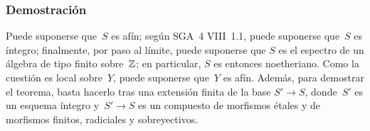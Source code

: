 \subsubsection*{Demostración}
Puede suponerse que~$S$ es afín; según SGA~4 VIII~1.1, puede suponerse
que~$S$ es íntegro; finalmente, por paso al límite, puede suponerse que
$S$ es el espectro de un álgebra de tipo finito sobre~$\mathbb Z$; en
particular, $S$ es entonces noetheriano.
Como la cuestión es local sobre~$Y$, puede suponerse que~$Y$ es afín.
Además, para demostrar el teorema, basta hacerlo tras una extensión finita
de la base $S'\to S$, donde~$S'$ es un esquema íntegro y~$S'\to S$ es un
compuesto de morfismos étales y de morfismos finitos, radiciales y
sobreyectivos.

